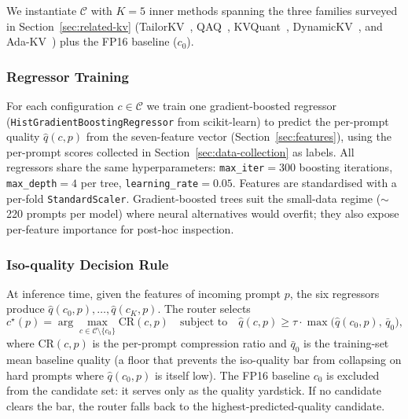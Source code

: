 \documentclass[10pt, conference]{IEEEtran}
\begin{document}
We instantiate $\mathcal{C}$ with $K=5$ inner methods spanning the three families surveyed in Section~\ref{sec:related-kv} (TailorKV~\cite{yao2025tailorkv}, QAQ~\cite{dong2024qaq}, KVQuant~\cite{hooper2024kvquant}, DynamicKV~\cite{zhou2024dynamickv}, and Ada-KV~\cite{feng2024adakv}) plus the FP16 baseline ($c_0$).

\subsubsection{Regressor Training}\label{sec:router-training}
For each configuration $c \in \mathcal{C}$ we train one gradient-boosted regressor (\texttt{HistGradientBoostingRegressor} from scikit-learn) to predict the per-prompt quality $\hat{q}(c, p)$ from the seven-feature vector (Section~\ref{sec:features}), using the per-prompt scores collected in Section~\ref{sec:data-collection} as labels. All regressors share the same hyperparameters: \texttt{max\_iter}$=300$ boosting iterations, \texttt{max\_depth}$=4$ per tree, \texttt{learning\_rate}$=0.05$. Features are standardised with a per-fold \texttt{StandardScaler}. Gradient-boosted trees suit the small-data regime ($\sim$220 prompts per model) where neural alternatives would overfit; they also expose per-feature importance for post-hoc inspection.

\subsubsection{Iso-quality Decision Rule}\label{sec:router-rule}
At inference time, given the features of incoming prompt $p$, the six regressors produce $\hat{q}(c_0, p), \ldots, \hat{q}(c_K, p)$. The router selects
\[
c^\star(p) = \arg\max_{c \in \mathcal{C} \setminus \{c_0\}} \mathrm{CR}(c, p)
\quad\text{subject to}\quad
\hat{q}(c, p) \geq \tau \cdot \max\bigl(\hat{q}(c_0, p),\, \bar{q}_0\bigr),
\]
where $\mathrm{CR}(c, p)$ is the per-prompt compression ratio and $\bar{q}_0$ is the training-set mean baseline quality (a floor that prevents the iso-quality bar from collapsing on hard prompts where $\hat{q}(c_0, p)$ is itself low). The FP16 baseline $c_0$ is excluded from the candidate set: it serves only as the quality yardstick. If no candidate clears the bar, the router falls back to the highest-predicted-quality candidate.


\end{document}
